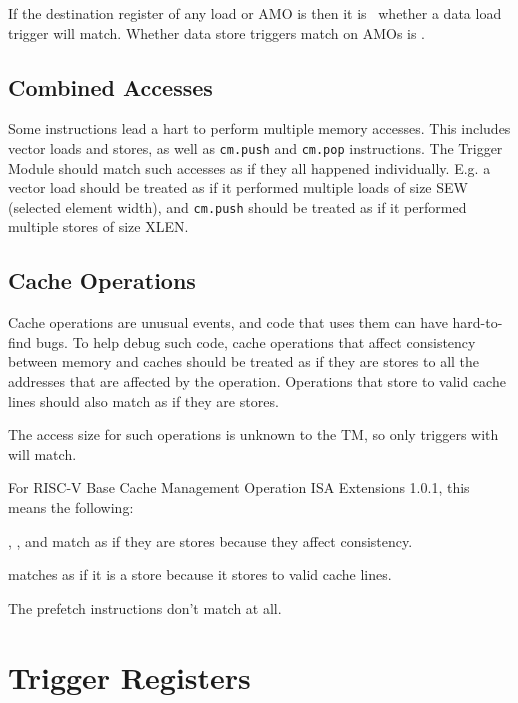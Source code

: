 If the destination register of any load or AMO is \Rzero then it is
\unspecified\ whether a data load trigger will match.  Whether data store
triggers match on AMOs is \unspecified.

\subsection{Combined Accesses}

Some instructions lead a hart to perform multiple memory accesses. This includes
vector loads and stores, as well as {\tt cm.push} and {\tt cm.pop} instructions.
The Trigger Module should match such accesses as if they all happened
individually. E.g. a vector load should be treated as if it performed multiple
loads of size SEW (selected element width), and {\tt cm.push} should be treated
as if it performed multiple stores of size XLEN.

\subsection{Cache Operations}

Cache operations are unusual events, and code that uses them can have
hard-to-find bugs. To help debug such code, cache operations that affect
consistency between memory and caches should be treated as if they are stores to
all the addresses that are affected by the operation.  Operations that store to
valid cache lines should also match as if they are stores.

The access size for such operations is unknown to the TM, so only triggers with
 will match.

\begin{commentary}
    \begin{steps}{For RISC-V Base Cache Management Operation ISA Extensions
            1.0.1, this means the following:}
        \item {}, , and  match as
            if they are stores because they affect consistency.
        \item {} matches as if it is a store because it stores to
            valid cache lines.
        \item The prefetch instructions don't match at all.
    \end{steps}
\end{commentary}

\section{Trigger Registers}

